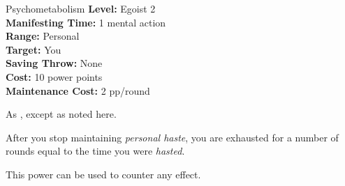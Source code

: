 {Psychometabolism}
{
	\textbf{Level:}
	Egoist 2\\
	\textbf{Manifesting Time:}
	1 mental action\\
	\textbf{Range:}
	Personal\\
	\textbf{Target:}
	You\\
	\textbf{Saving Throw:}
	None\\
	\textbf{Cost:}
	10 power points\\
	\textbf{Maintenance Cost:}
	2 pp/round\\
}
{
	As , except as noted here.

	After you stop maintaining \emph{personal haste}, you are exhausted for a number of rounds equal to the time you were \emph{hasted}.

	This power can be used to counter any  effect.
}